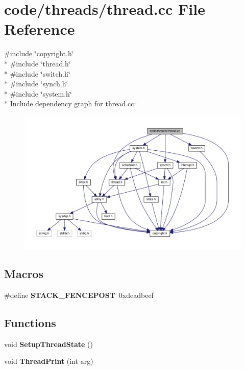 \section{code/threads/thread.cc File Reference}
\label{thread_8cc}
{\ttfamily \#include \char`\"{}copyright.\+h\char`\"{}}\\*
{\ttfamily \#include \char`\"{}thread.\+h\char`\"{}}\\*
{\ttfamily \#include \char`\"{}switch.\+h\char`\"{}}\\*
{\ttfamily \#include \char`\"{}synch.\+h\char`\"{}}\\*
{\ttfamily \#include \char`\"{}system.\+h\char`\"{}}\\*
Include dependency graph for thread.\+cc\+:
\nopagebreak
\begin{figure}[H]
\begin{center}
\leavevmode
\includegraphics[width=350pt]{thread_8cc__incl}
\end{center}
\end{figure}
\subsection*{Macros}
\begin{DoxyCompactItemize}
\item 
\#define {\bf S\+T\+A\+C\+K\+\_\+\+F\+E\+N\+C\+E\+P\+O\+ST}~0xdeadbeef
\end{DoxyCompactItemize}
\subsection*{Functions}
\begin{DoxyCompactItemize}
\item 
void {\bf Setup\+Thread\+State} ()
\item 
void {\bf Thread\+Print} (int arg)
\end{DoxyCompactItemize}


